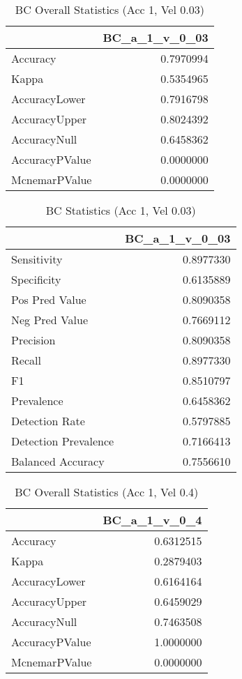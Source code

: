 \documentclass[]{article}
\begin{document}
\begin{table}[!h]

\caption{\label{tab:bc_accuracy_chunk}BC Overall Statistics (Acc 1, Vel 0.03)}
\centering
\begin{tabular}[t]{lr}
\toprule
  & BC\_a\_1\_v\_0\_03\\
\midrule
Accuracy & 0.7970994\\
Kappa & 0.5354965\\
AccuracyLower & 0.7916798\\
AccuracyUpper & 0.8024392\\
AccuracyNull & 0.6458362\\
\addlinespace
AccuracyPValue & 0.0000000\\
McnemarPValue & 0.0000000\\
\bottomrule
\end{tabular}
\end{table}

\begin{table}[!h]

\caption{\label{tab:bc_accuracy_chunk}BC Statistics (Acc 1, Vel 0.03)}
\centering
\begin{tabular}[t]{lr}
\toprule
  & BC\_a\_1\_v\_0\_03\\
\midrule
Sensitivity & 0.8977330\\
Specificity & 0.6135889\\
Pos Pred Value & 0.8090358\\
Neg Pred Value & 0.7669112\\
Precision & 0.8090358\\
\addlinespace
Recall & 0.8977330\\
F1 & 0.8510797\\
Prevalence & 0.6458362\\
Detection Rate & 0.5797885\\
Detection Prevalence & 0.7166413\\
Balanced Accuracy & 0.7556610\\
\bottomrule
\end{tabular}
\end{table}

\begin{table}[!h]

\caption{\label{tab:bc_accuracy_chunk}BC Overall Statistics (Acc 1, Vel 0.4)}
\centering
\begin{tabular}[t]{lr}
\toprule
  & BC\_a\_1\_v\_0\_4\\
\midrule
Accuracy & 0.6312515\\
Kappa & 0.2879403\\
AccuracyLower & 0.6164164\\
AccuracyUpper & 0.6459029\\
AccuracyNull & 0.7463508\\
\addlinespace
AccuracyPValue & 1.0000000\\
McnemarPValue & 0.0000000\\
\bottomrule
\end{tabular}
\end{table}
\end{document}
